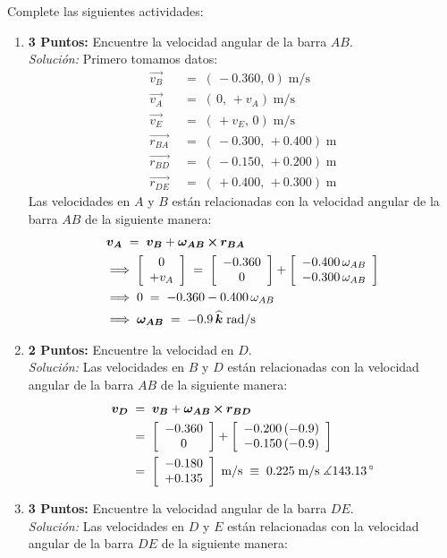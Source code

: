 \documentclass[ a4paper, twoside, 11pt]{article}
\begin{document}
\begin{problem}
Complete las siguientes actividades: 
\begin{enumerate}[label=\textbf{\alph*)}]
\item \textbf{3 Puntos:} Encuentre la velocidad angular de la barra $AB$. \\[1ex] \emph{Soluci\'on:} Primero tomamos datos: 
\begin{align*}
\vec{v_B} \; & = \; ( \, -0.360, \, 0) \; \text{m/s} \\
\vec{v_A} \; & = \; ( \, 0, \, +v_A) \; \text{m/s} \\
\vec{v_E} \; & = \; ( \, +v_E, \, 0 ) \; \text{m/s} \\
\vec{r_{BA}} \; & = \; ( \, -0.300, \, +0.400 ) \; \text{m} \\
\vec{r_{BD}} \; & = \; ( \, -0.150, \, +0.200 ) \; \text{m} \\
\vec{r_{DE}} \; & = \; ( \, +0.400, \, +0.300 ) \; \text{m}
\end{align*}
Las velocidades en $A$ y $B$ est\'an relacionadas con la velocidad angular de la barra $AB$ de la siguiente manera:
\begin{align*}
& {\boldsymbol{v_A}} \; = \; {\boldsymbol{v_B}} + {\boldsymbol{\omega_{AB}}} \,{\boldsymbol{\times}}\, {\boldsymbol{r_{BA}}} \\
& \Longrightarrow \; \left[ \begin{array}{c} 0 \\ +v_A \end{array} \right] \; = \; 
\left[ \begin{array}{c} -0.360 \\ 0 \end{array} \right] +
\left[ \begin{array}{c}  -0.400 \, \omega_{AB} \\  -0.300 \, \omega_{AB} \end{array} \right] \\
& \Longrightarrow \;
0 \; = \; -0.360 - 0.400 \, \omega_{AB} \\
& \Longrightarrow \;
{\boldsymbol{\omega_{AB}}} \; = \; -0.9 \, {\boldsymbol{\widehat{k}}} \; \text{rad/s}
\end{align*}
\item \textbf{2 Puntos:} Encuentre la velocidad en $D$. \\[1ex] \emph{Soluci\'on:} Las velocidades en $B$ y $D$ est\'an relacionadas con la velocidad angular de la barra $AB$ de la siguiente manera:
\begin{align*}
{\boldsymbol{v_D}} \; 
& = \; {\boldsymbol{v_B}} + {\boldsymbol{\omega_{AB}}} \,{\boldsymbol{\times}}\, {\boldsymbol{r_{BD}}} \\
& = \; \left[ \begin{array}{c} -0.360 \\ 0 \end{array} \right] +
\left[ \begin{array}{c}  -0.200 \, (-0.9) \\  -0.150 \, (-0.9) \end{array} \right] \\
& = \;
\left[ \begin{array}{c}  -0.180 \\  +0.135 \end{array} \right] \; \text{m/s} \; \equiv \;
0.225 \; \text{m/s} \; \measuredangle 143.13^{\,\circ}
\end{align*}
\item \textbf{3 Puntos:} Encuentre la velocidad angular de la barra $DE$. \\[1ex] \emph{Soluci\'on:} Las velocidades en $D$ y $E$ est\'an relacionadas con la velocidad angular de la barra $DE$ de la siguiente manera:

\end{enumerate}
\end{problem}
\end{document}
